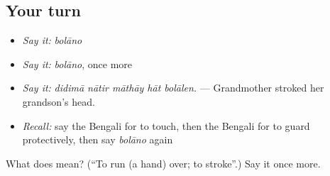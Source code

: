 \subsection*{Your turn}
\begin{itemize}
\raggedright
  \item \emph{Say it:} \emph{bolāno}
  \item \emph{Say it:} \emph{bolāno}, once more
  \item \emph{Say it:} \emph{didimā nātir māthāy hāt bolālen.} — Grandmother stroked her grandson's head.
  \item \emph{Recall:} say the Bengali for to touch, then the Bengali for to guard protectively, then say \emph{bolāno} again
\end{itemize}

\begin{tcolorbox}[breakable,colback=teal!4,colframe=teal!35!black,title={Before you move on}]
What does  mean? (\textquotedblleft{}To run (a hand) over; to stroke\textquotedblright{}.) Say it once more.
\end{tcolorbox}
